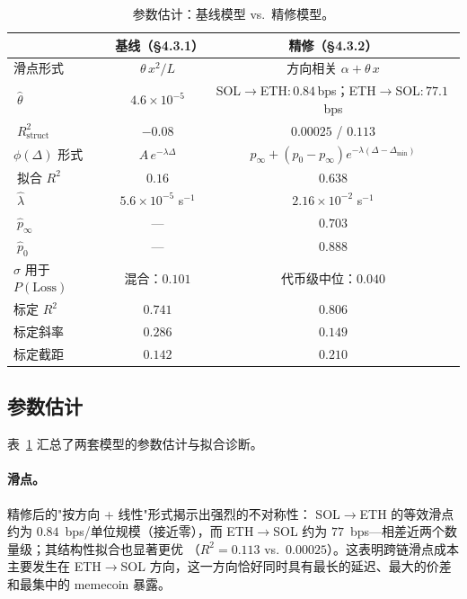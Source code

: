 \documentclass[sigconf,nonacm,10pt]{acmart}
\newcommand{\SolEth}{SOL$\to$ETH}
\newcommand{\EthSol}{ETH$\to$SOL}
\begin{document}
\begin{table}[t]
    \centering
    \small
    \caption{参数估计：基线模型 vs.\ 精修模型。}
    \label{tab:ch4-validation}
    \begin{tabular}{lcc}
        \toprule
        & 基线（§4.3.1） & 精修（§4.3.2） \\
        \midrule
        滑点形式 & $\theta\,x^{2}/L$ & 方向相关 $\alpha + \theta\,x$ \\
        $\;\hat\theta$ & $4.6\!\times\!10^{-5}$ & \SolEth:\,$0.84$\,bps；\EthSol:\,$77.1$\,bps \\
        $\;R^{2}_{\text{struct}}$ & $-0.08$ & $0.00025$ / $0.113$ \\
        \addlinespace
        $\phi(\Delta)$ 形式 & $A\,e^{-\lambda\Delta}$ & $p_{\infty}+(p_{0}-p_{\infty})e^{-\lambda(\Delta-\Delta_{\min})}$ \\
        $\;$拟合 $R^{2}$ & $0.16$ & $\mathbf{0.638}$ \\
        $\;\hat\lambda$ & $5.6\!\times\!10^{-5}$ s$^{-1}$ & $2.16\!\times\!10^{-2}$ s$^{-1}$ \\
        $\;\hat p_{\infty}$ & --- & $0.703$ \\
        $\;\hat p_{0}$ & --- & $0.888$ \\
        \addlinespace
        $\sigma$ 用于 $P(\text{Loss})$ & 混合：$0.101$ & 代币级中位：$0.040$ \\
        标定 $R^{2}$ & $0.741$ & $\mathbf{0.806}$ \\
        标定斜率 & $0.286$ & $0.149$ \\
        标定截距 & $0.142$ & $0.210$ \\
        \bottomrule
    \end{tabular}
\end{table}

\subsection{参数估计}

表~\ref{tab:ch4-validation} 汇总了两套模型的参数估计与拟合诊断。

\paragraph{滑点。} 精修后的"按方向 + 线性"形式揭示出强烈的不对称性：
\SolEth{} 的等效滑点约为 $0.84$~bps/单位规模（接近零），而 \EthSol{}
约为 $77$~bps---相差近两个数量级；其结构性拟合也显著更优
（$R^{2}\!=\!0.113$ vs.\ $0.00025$）。这表明跨链滑点成本主要发生在
\EthSol{} 方向，这一方向恰好同时具有最长的延迟、最大的价差和最集中的
memecoin 暴露。
\end{document}
